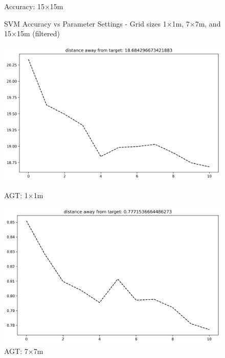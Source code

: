 \documentclass[runningheads]{llncs}
\begin{document}
\begin{figure}[H]
\begin{minipage}{0.32\textwidth}
		\caption*{Accuracy: 15×15m}
	\end{minipage}
	\caption{SVM Accuracy vs Parameter Settings - Grid sizes 1×1m, 7×7m, and 15×15m (filtered)}
\end{figure}

\begin{figure}[H]
	\centering
	\begin{minipage}{0.32\textwidth}
		\centering
		\includegraphics[width=\textwidth]{figures/svm_custom_1.png}
		\caption*{AGT: 1×1m}
	\end{minipage}
	\hfill
	\begin{minipage}{0.32\textwidth}
		\centering
		\includegraphics[width=\textwidth]{figures/svm_custom_7.png}
		\caption*{AGT: 7×7m}
	\end{minipage}
	\hfill
	\begin{minipage}{0.32\textwidth}
		\centering

\end{minipage}
\end{figure}
\end{document}
